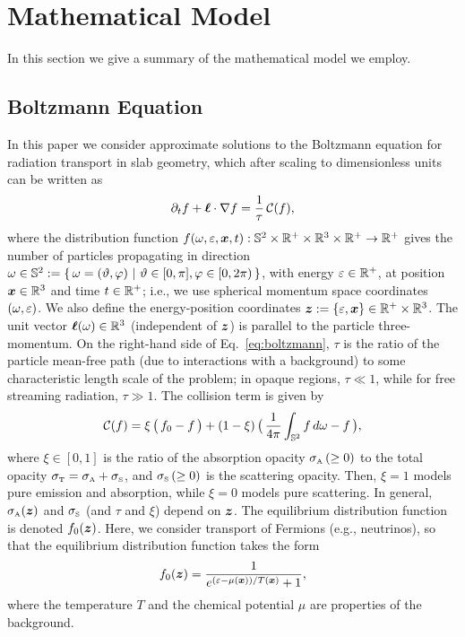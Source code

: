 \section{Mathematical Model}

In this section we give a summary of the mathematical model we employ.  

\subsection{Boltzmann Equation}

In this paper we consider approximate solutions to the Boltzmann equation for radiation transport in slab geometry, which after scaling to dimensionless units can be written as
\begin{equation}
  \pd{f}{t}+\vect{\ell}\cdot\nabla f
  =\f{1}{\tau}\,\cC(f),
  \label{eq:boltzmann}
\end{equation}
where the distribution function $f(\omega,\varepsilon,\boldsymbol{x},t):\mathbb{S}^{2}\times\mathbb{R}^{+}\times\mathbb{R}^{3}\times\mathbb{R}^{+}\to\mathbb{R}^{+}$ gives the number of particles propagating in direction $\omega\in\mathbb{S}^{2}:=\{\,\omega=(\vartheta,\varphi)~|~\vartheta\in[0,\pi],\varphi\in[0,2\pi)\,\}$, with energy $\varepsilon\in\mathbb{R}^{+}$, at position $\boldsymbol{x}\in\mathbb{R}^{3}$ and time $t\in\mathbb{R}^{+}$; i.e., we use spherical momentum space coordinates $(\omega,\varepsilon)$.  
We also define the energy-position coordinates $\boldsymbol{z}:=\{\varepsilon,\boldsymbol{x}\}\in\mathbb{R}^{+}\times\mathbb{R}^{3}$.  
The unit vector $\boldsymbol{\ell}(\omega)\in\mathbb{R}^{3}$ (independent of $\boldsymbol{z}$) is parallel to the particle three-momentum.  
On the right-hand side of Eq.~\eqref{eq:boltzmann}, $\tau$ is the ratio of the particle mean-free path (due to interactions with a background) to some characteristic length scale of the problem; in opaque regions, $\tau\ll1$, while for free streaming radiation, $\tau\gg1$.  
The collision term is given by
\begin{equation}
  \cC(f)=\xi\,\big(\,f_{0}-f\,\big)
  +(1-\xi)\,\big(\,\f{1}{4\pi}\int_{\bbS^{2}}f\,d\omegaNu-f\,\big),
  \label{eq:collisionTerm}
\end{equation}
where $\xi\in[0,1]$ is the ratio of the absorption opacity $\sigma_{\mbox{\tiny A}}\,(\ge0)$ to the total opacity $\sigma_{\mbox{\tiny T}}=\sigma_{\mbox{\tiny A}}+\sigma_{\mbox{\tiny S}}$, and $\sigma_{\mbox{\tiny S}}\,(\ge0)$ is the scattering opacity.  
Then, $\xi=1$ models pure emission and absorption, while $\xi=0$ models pure scattering.  
In general, $\sigma_{\mbox{\tiny A}}(\boldsymbol{z})$ and $\sigma_{\mbox{\tiny S}}$ (and $\tau$ and $\xi$) depend on $\boldsymbol{z}$.  
The equilibrium distribution function is denoted $f_{0}(\boldsymbol{z})$.  
Here, we consider transport of Fermions (e.g., neutrinos), so that the equilibrium distribution function takes the form
\begin{equation}
  f_{0}(\vect{z})=\f{1}{e^{(\epsilonNu-\mu(\vect{x}))/T(\vect{x})}+1},  
  \label{eq:fermiDirac}
\end{equation}
where the temperature $T$ and the chemical potential $\mu$ are properties of the background.  

